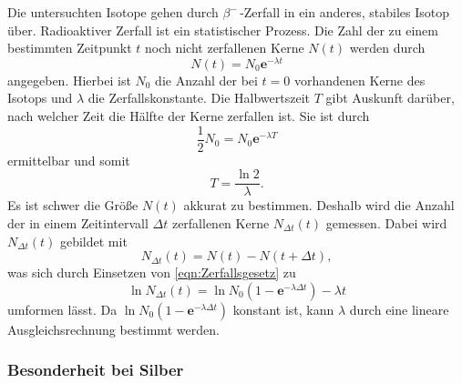 Die untersuchten Isotope gehen durch $\beta^-\,$-Zerfall in ein anderes, stabiles Isotop über.
Radioaktiver Zerfall ist ein statistischer Prozess.
Die Zahl der zu einem bestimmten Zeitpunkt $t$ noch nicht zerfallenen Kerne $N(t)$ werden durch
\begin{equation}\label{eqn:Zerfallsgesetz}
    N(t) = N_0 \textbf{e}^{-\lambda t}
\end{equation}
angegeben. Hierbei ist $N_0$ die Anzahl der bei $t=0$ vorhandenen Kerne des Isotops und $\lambda$ die Zerfallskonstante.	
Die Halbwertszeit $T$ gibt Auskunft darüber, nach welcher Zeit die Hälfte der Kerne zerfallen ist.
Sie ist durch
\begin{equation*}
    \frac{1}{2}N_0 = N_0 \textbf{e}^{-\lambda T}
\end{equation*}
ermittelbar und somit 
\begin{equation*}
    T = \frac{\ln 2}{\lambda}.
\end{equation*}
Es ist schwer die Größe $N(t)$ akkurat zu bestimmen. 
Deshalb wird die Anzahl der in einem Zeitintervall $\Delta t$ zerfallenen Kerne $N_{\Delta t}(t)$ gemessen.
Dabei wird $N_{\Delta t}(t)$ gebildet mit
\begin{equation*}
    N_{\Delta t}(t) = N(t) - N(t + \Delta t),
\end{equation*}
was sich durch Einsetzen von \eqref{eqn:Zerfallsgesetz} zu
\begin{equation*}%
    \ln N_{\Delta t}(t) = \ln{N_0}\left(1 - \textbf{e}^{-\lambda\Delta t}\right) - \lambda t
\end{equation*}
umformen lässt.
Da $\ln N_0(1 - \textbf{e}^{-\lambda\Delta t})$ konstant ist, kann $\lambda$ durch eine lineare Ausgleichsrechnung bestimmt werden.

\subsubsection{Besonderheit bei Silber}
\label{subsubsec:Besonderheit bei Silber}

